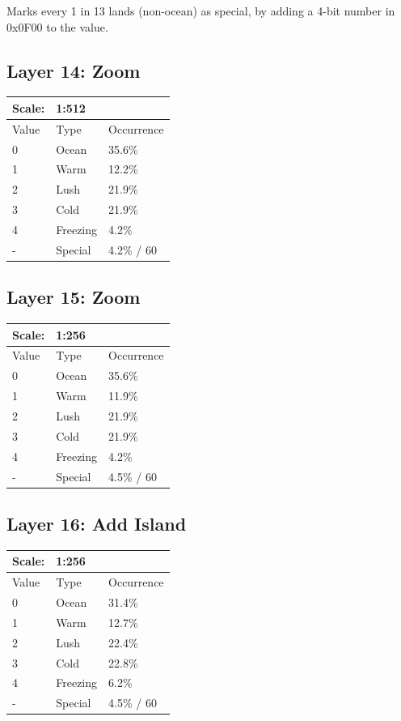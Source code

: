 \documentclass{article}
\begin{document}
	\medskip\noindent
	Marks every 1 in 13 lands (non-ocean) as special, by adding a 4-bit number in 0x0F00 to the value.


	\subsection{Layer 14: Zoom}
	\begin{tabular}{|l|l|l|}\hline
		Scale: & \multicolumn{2}{|l|}{1:512} \\\hline\hline
		Value  & Type   & Occurrence \\\hline
		0      & Ocean    & 35.6\%\\\hline
		1      & Warm     & 12.2\%\\\hline
		2      & Lush     & 21.9\%\\\hline
		3      & Cold     & 21.9\%\\\hline
		4      & Freezing & 4.2\%\\\hline
		-      & Special  & 4.2\% / 60\\\hline
	\end{tabular}

	\subsection{Layer 15: Zoom}
	\begin{tabular}{|l|l|l|}\hline
		Scale: & \multicolumn{2}{|l|}{1:256} \\\hline\hline
		Value  & Type   & Occurrence \\\hline
		0      & Ocean    & 35.6\%\\\hline
		1      & Warm     & 11.9\%\\\hline
		2      & Lush     & 21.9\%\\\hline
		3      & Cold     & 21.9\%\\\hline
		4      & Freezing & 4.2\%\\\hline
		-      & Special  & 4.5\% / 60\\\hline
	\end{tabular}

	\subsection{Layer 16: Add Island}
	\begin{tabular}{|l|l|l|}\hline
		Scale: & \multicolumn{2}{|l|}{1:256} \\\hline\hline
		Value  & Type   & Occurrence \\\hline
		0      & Ocean    & 31.4\%\\\hline
		1      & Warm     & 12.7\%\\\hline
		2      & Lush     & 22.4\%\\\hline
		3      & Cold     & 22.8\%\\\hline
		4      & Freezing & 6.2\%\\\hline
		-      & Special  & 4.5\% / 60\\\hline
	\end{tabular}
\end{document}

